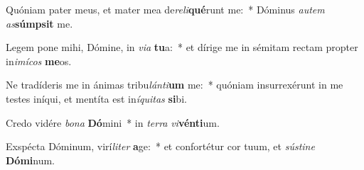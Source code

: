 \item Quóniam pater meus, et mater mea de\textit{re}\textit{li}\textbf{qué}runt me:~* Dóminus \textit{au}\textit{tem} \textit{as}\textbf{súmp}\textbf{sit} me.
\item Legem pone mihi, Dómine, in \textit{vi}\textit{a} \textbf{tu}a:~* et dírige me in sémitam rectam propter in\textit{i}\textit{mí}\textit{cos} \textbf{me}os.
\item Ne tradíderis me in ánimas tribu\textit{lán}\textit{ti}\textbf{um} me:~* quóniam insurrexérunt in me testes iníqui, et mentíta est in\textit{í}\textit{qui}\textit{tas} \textbf{si}bi.
\item Credo vidére \textit{bo}\textit{na} \textbf{Dó}mini~* in \textit{ter}\textit{ra} \textit{vi}\textbf{vén}\textbf{ti}um.
\item Exspécta Dóminum, virí\textit{li}\textit{ter} \textbf{a}ge:~* et confortétur cor tuum, et \textit{sús}\textit{ti}\textit{ne} \textbf{Dó}\textbf{mi}num.

